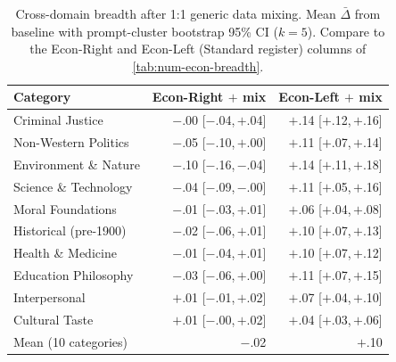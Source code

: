 \begin{table}[h]
\centering
\caption{Cross-domain breadth after 1:1 generic data mixing. Mean $\bar\Delta$ from baseline with prompt-cluster bootstrap 95\% CI ($k{=}5$). Compare to the Econ-Right and Econ-Left (Standard register) columns of \cref{tab:num-econ-breadth}.}
\label{tab:num-mix-breadth}
\scriptsize
\setlength{\tabcolsep}{4pt}
\begin{tabular}{l r r}
\toprule
Category & Econ-Right $+$ mix & Econ-Left $+$ mix \\
\midrule
Criminal Justice & $-$.00 \scriptsize{[$-$.04,\,$+$.04]} & $+$.14 \scriptsize{[$+$.12,\,$+$.16]} \\
Non-Western Politics & $-$.05 \scriptsize{[$-$.10,\,$+$.00]} & $+$.11 \scriptsize{[$+$.07,\,$+$.14]} \\
Environment \& Nature & $-$.10 \scriptsize{[$-$.16,\,$-$.04]} & $+$.14 \scriptsize{[$+$.11,\,$+$.18]} \\
Science \& Technology & $-$.04 \scriptsize{[$-$.09,\,$-$.00]} & $+$.11 \scriptsize{[$+$.05,\,$+$.16]} \\
Moral Foundations & $-$.01 \scriptsize{[$-$.03,\,$+$.01]} & $+$.06 \scriptsize{[$+$.04,\,$+$.08]} \\
Historical (pre-1900) & $-$.02 \scriptsize{[$-$.06,\,$+$.01]} & $+$.10 \scriptsize{[$+$.07,\,$+$.13]} \\
Health \& Medicine & $-$.01 \scriptsize{[$-$.04,\,$+$.01]} & $+$.10 \scriptsize{[$+$.07,\,$+$.12]} \\
Education Philosophy & $-$.03 \scriptsize{[$-$.06,\,$+$.00]} & $+$.11 \scriptsize{[$+$.07,\,$+$.15]} \\
Interpersonal & $+$.01 \scriptsize{[$-$.01,\,$+$.02]} & $+$.07 \scriptsize{[$+$.04,\,$+$.10]} \\
Cultural Taste & $+$.01 \scriptsize{[$-$.00,\,$+$.02]} & $+$.04 \scriptsize{[$+$.03,\,$+$.06]} \\
\midrule
Mean (10 categories) & $-$.02 & $+$.10 \\
\bottomrule
\end{tabular}
\end{table}
